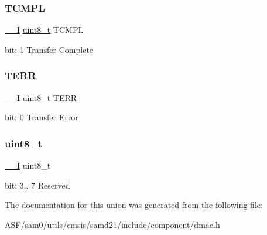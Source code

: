 \subsubsection{\texorpdfstring{TCMPL}{TCMPL}}
{\footnotesize\ttfamily \mbox{\hyperlink{core__cm0plus_8h_af63697ed9952cc71e1225efe205f6cd3}{\+\_\+\+\_\+I}} \mbox{\hyperlink{union_d_m_a_c___c_h_i_n_t_f_l_a_g___type_a5b4208c6f4c4a4290c4f2804d1eb1d5b}{uint8\+\_\+t}} T\+C\+M\+PL}

bit\+: 1 Transfer Complete \mbox{\label{union_d_m_a_c___c_h_i_n_t_f_l_a_g___type_a46f0d638374cee22497a02cbf652b52b}} 
\subsubsection{\texorpdfstring{TERR}{TERR}}
{\footnotesize\ttfamily \mbox{\hyperlink{core__cm0plus_8h_af63697ed9952cc71e1225efe205f6cd3}{\+\_\+\+\_\+I}} \mbox{\hyperlink{union_d_m_a_c___c_h_i_n_t_f_l_a_g___type_a5b4208c6f4c4a4290c4f2804d1eb1d5b}{uint8\+\_\+t}} T\+E\+RR}

bit\+: 0 Transfer Error \mbox{\label{union_d_m_a_c___c_h_i_n_t_f_l_a_g___type_a5b4208c6f4c4a4290c4f2804d1eb1d5b}} 
\subsubsection{\texorpdfstring{uint8\_t}{uint8\_t}}
{\footnotesize\ttfamily \mbox{\hyperlink{core__cm0plus_8h_af63697ed9952cc71e1225efe205f6cd3}{\+\_\+\+\_\+I}} uint8\+\_\+t}

bit\+: 3.. 7 Reserved 

The documentation for this union was generated from the following file\+:\begin{DoxyCompactItemize}
\item 
A\+S\+F/sam0/utils/cmsis/samd21/include/component/\mbox{\hyperlink{component_2dmac_8h}{dmac.\+h}}\end{DoxyCompactItemize}

